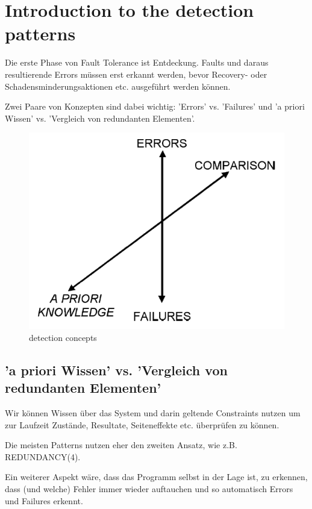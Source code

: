 \section{Introduction to the detection patterns}


Die erste Phase von Fault Tolerance ist Entdeckung. Faults und daraus resultierende Errors müssen erst erkannt werden, bevor Recovery- oder Schadensminderungsaktionen etc. ausgeführt werden können.

Zwei Paare von Konzepten sind dabei wichtig: 'Errors' vs. 'Failures' und 'a priori Wissen' vs. 'Vergleich von redundanten Elementen'.
\begin{figure}[H]
	\centering
	\includegraphics[width=\textwidth]{content/faulttolerance/images/detection_concepts.png}
	\caption{detection concepts}
\end{figure}


\subsection{'a priori Wissen' vs. 'Vergleich von redundanten Elementen'}


Wir können Wissen über das System und darin geltende Constraints nutzen um zur Laufzeit Zustände, Resultate, Seiteneffekte etc. überprüfen zu können.

Die meisten Patterns nutzen eher den zweiten Ansatz, wie z.B. REDUNDANCY(4).

Ein weiterer Aspekt wäre, dass das Programm selbst in der Lage ist, zu erkennen, dass (und welche) Fehler immer wieder auftauchen und so automatisch Errors und Failures erkennt.

